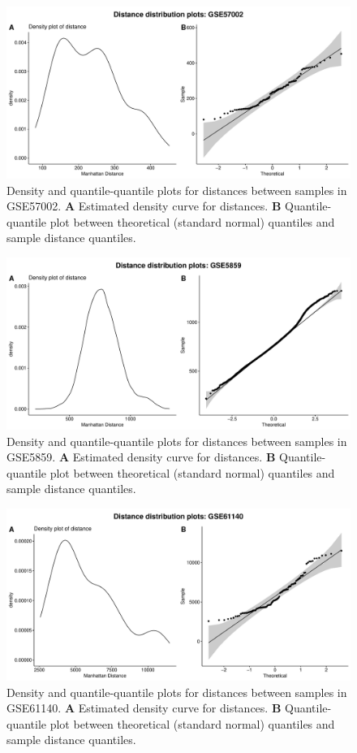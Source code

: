 \documentclass[10pt,letterpaper]{article}\usepackage[]{graphicx}\usepackage[]{color}
\begin{document}
\begin{figure}[H]
	\includegraphics[width=\textwidth]{manhattan-distance_hist_GSE57002.pdf}
	\caption{Density and quantile-quantile plots for distances between samples in GSE57002. \textbf{A} Estimated density curve for distances. \textbf{B} Quantile-quantile plot between theoretical (standard normal) quantiles and sample distance quantiles.}
\end{figure}

\begin{figure}[H]
	\includegraphics[width=\textwidth]{manhattan-distance_hist_GSE5859.pdf}
	\caption{Density and quantile-quantile plots for distances between samples in GSE5859. \textbf{A} Estimated density curve for distances. \textbf{B} Quantile-quantile plot between theoretical (standard normal) quantiles and sample distance quantiles.}
\end{figure}

\begin{figure}[H]
	\includegraphics[width=\textwidth]{manhattan-distance_hist_GSE61140.pdf}
	\caption{Density and quantile-quantile plots for distances between samples in GSE61140. \textbf{A} Estimated density curve for distances. \textbf{B} Quantile-quantile plot between theoretical (standard normal) quantiles and sample distance quantiles.}
\end{figure}
\end{document}

